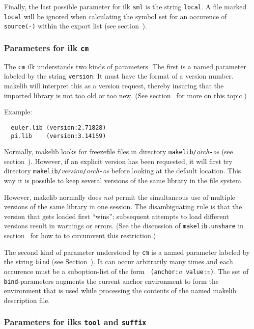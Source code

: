 Finally, the last possible parameter for ilk {\tt sml} is the string
{\tt local}.  A file marked {\tt local} will be ignored when
calculating the symbol set for an occurence of {\tt source(-)} within
the export list (see section~).

\subsubsection{Parameters for ilk {\tt cm}}
\label{sec:toolparam:cm}

The {\tt cm} ilk understands two kinds of parameters.  The first is
a named parameter labeled by the string {\tt version}.  It must have
the format of a version number.  makelib will interpret this as a version
request, thereby insuring that the imported library is not too old or
too new. (See section~ for more on this topic.)

Example:

\begin{verbatim}
  euler.lib (version:2.71828)
  pi.lib    (version:3.14159)
\end{verbatim}

Normally, makelib looks for freezefile files in directory
{\tt makelib/}{\it arch}{\tt -}{\it os} (see section~).
However, if an explicit version has been requested, it will first try
directory {\tt makelib/}{\it version}{\tt /}{\it arch}{\tt -}{\it os}
before looking at the default location.  This way it is possible to
keep several versions of the same library in the file system.

However, makelib normally does {\em not} permit the simultaneous use of
multiple versions of the same library in one session.  The
disambiguating rule is that the version that gets loaded first
``wins''; subsequent attempts to load different versions result in
warnings or errors.  (See the discussion of {\tt makelib.unshare} in
section~ for how to to circumvent this restriction.)

The second kind of parameter understood by {\tt cm} is a named
parameter labeled by the string {\tt bind} (see
Section~).  It can occur arbitrarily many times
and each occurence must be a suboption-list of the form {\tt
(anchor:$a$ value:$v$)}.  The set of {\tt bind}-parameters augments
the current anchor environment to form the environment that is used
while processing the contents of the named makelib description file.

\subsubsection{Parameters for ilks {\tt tool} and {\tt suffix}}

